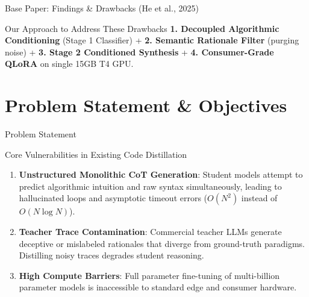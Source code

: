 \documentclass[aspectratio=169,10pt]{beamer}
\begin{document}
\begin{frame}{Base Paper: Findings \& Drawbacks (He et al., 2025)}
  \vspace{3pt}
  \begin{exampleblock}{Our Approach to Address These Drawbacks}
    \footnotesize
    \textbf{1. Decoupled Algorithmic Conditioning} (Stage 1 Classifier) + \textbf{2. Semantic Rationale Filter} (purging noise) + \textbf{3. Stage 2 Conditioned Synthesis} + \textbf{4. Consumer-Grade QLoRA} on single 15GB T4 GPU.
  \end{exampleblock}
\end{frame}

\section{Problem Statement \& Objectives}

\begin{frame}{Problem Statement}
  \begin{alertblock}{Core Vulnerabilities in Existing Code Distillation}
    \begin{enumerate}\itemsep=6pt
      \item \textbf{Unstructured Monolithic CoT Generation}: Student models attempt to predict algorithmic intuition and raw syntax simultaneously, leading to hallucinated loops and asymptotic timeout errors ($O(N^2)$ instead of $O(N \log N)$).
      \item \textbf{Teacher Trace Contamination}: Commercial teacher LLMs generate deceptive or mislabeled rationales that diverge from ground-truth paradigms. Distilling noisy traces degrades student reasoning.
      \item \textbf{High Compute Barriers}: Full parameter fine-tuning of multi-billion parameter models is inaccessible to standard edge and consumer hardware.
    \end{enumerate}
  \end{alertblock}
\end{frame}
\end{document}
